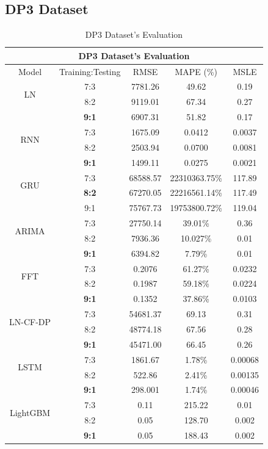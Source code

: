 \documentclass{ieeeojies}
\begin{document}
\subsection{DP3 Dataset}
\begin{table}[H]
    \centering
    \begin{tabular}{|c|c|c|c|c|}
         \hline
         \multicolumn{5}{|c|}{\textbf{DP3 Dataset's Evaluation}}\\
         \hline
         \centering Model & Training:Testing & RMSE & MAPE (\%) & MSLE\\
         \hline
         \multirow{2}{*}{LN}& 7:3 & 7781.26 & 49.62 & 0.19\\ & 8:2 & 9119.01 & 67.34 & 0.27\\ & \textbf{9:1}& 6907.31& 51.82 & 0.17\\
         \hline
         \multirow{2}{*}{RNN} & 7:3&1675.09&0.0412&0.0037\\ & 8:2&2503.94&0.0700&0.0081\\ & \textbf{9:1} & 1499.11&0.0275 &0.0021 \\
         \hline
         \multirow{2}{*}{GRU} & 7:3	& 68588.57 & 22310363.75\% & 117.89 \\ & \textbf{8:2} & 67270.05 & 22216561.14\% & 117.49 \\ & 9:1 & 75767.73 & 19753800.72\% & 119.04 \\
         \hline
         \multirow{2}{*}{ARIMA} & 7:3 & 27750.14  & 39.01\%  &  0.36 \\ & 8:2 & 7936.36  & 10.027\% & 0.01 \\ & \textbf{9:1} & 6394.82 & 7.79\% & 0.01 \\
         \hline
         \multirow{2}{*}{FFT}& 7:3& 0.2076& 61.27\%&0.0232 \\ & 8:2 & 0.1987& 59.18\%& 0.0224\\ & \textbf{9:1}& 0.1352& 37.86\%& 0.0103\\
         \hline
         \multirow{2}{*}{LN-CF-DP} & 7:3 & 54681.37 & 69.13 & 0.31 \\ & {8:2} & 48774.18 & 67.56 & 0.28 \\ & \textbf{9:1} & 45471.00 &66.45&0.26\\
         \hline
         \multirow{2}{*}{LSTM}& 7:3& 1861.67& 1.78\%& 0.00068\\ & 8:2 & 522.86& 2.41\%& 0.00135\\ & \textbf{9:1}& 298.001& 1.74\%& 0.00046\\
         \hline
         \multirow{2}{*}{LightGBM}& 7:3& 0.11& 215.22 & 0.01\\ & 8:2 & 0.05& 128.70 & 0.002\\ & \textbf{9:1}& 0.05& 188.43 & 0.002\\
         \hline
    \end{tabular}
    \caption{DP3 Dataset's Evaluation}
    \label{dp3result}
\end{table}
\end{document}
